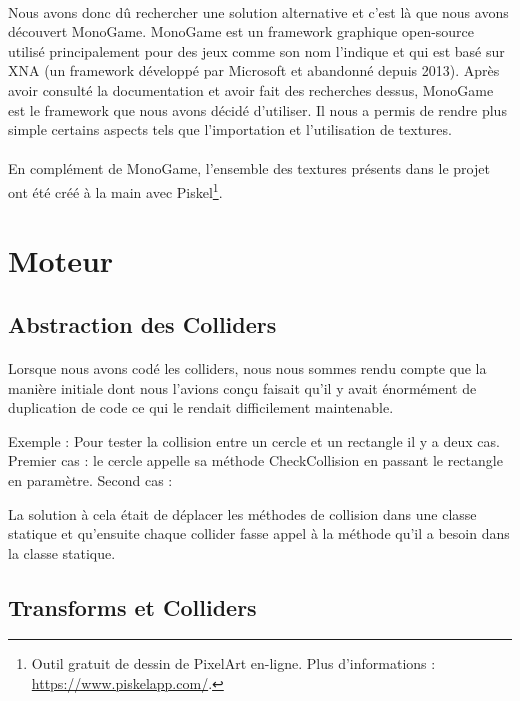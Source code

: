 \documentclass{EPUProjetDi}
\begin{document}
\paragraph{}
Nous avons donc dû rechercher une solution alternative et c'est là que nous avons découvert MonoGame. 
MonoGame est un framework graphique open-source utilisé principalement pour des jeux comme son nom l'indique et qui est basé
sur XNA (un framework développé par Microsoft et abandonné depuis 2013). 
Après avoir consulté la documentation et avoir fait des recherches dessus, MonoGame est le framework que nous avons décidé d'utiliser. 
Il nous a permis de rendre plus simple certains aspects tels que l'importation et l'utilisation de textures.

\paragraph{}
En complément de MonoGame, l'ensemble des textures présents dans le projet ont été créé à la main avec Piskel\footnote{Outil gratuit de dessin de PixelArt en-ligne. 
Plus d'informations : \url{https://www.piskelapp.com/}.}. 

\section{Moteur}

\subsection{Abstraction des Colliders}

\paragraph{}
Lorsque nous avons codé les colliders, nous nous sommes rendu compte que la manière initiale dont nous l'avions conçu
faisait qu'il y avait énormément de duplication de code ce qui le rendait difficilement maintenable.

Exemple : Pour tester la collision entre un cercle et un rectangle il y a deux cas. Premier cas : le cercle appelle sa méthode CheckCollision en passant le rectangle en paramètre.
Second cas : 

La solution à cela était de déplacer les méthodes de collision dans une classe statique et qu'ensuite chaque collider fasse appel à la méthode qu'il a besoin dans la classe statique.

\subsection{Transforms et Colliders}
\end{document}
